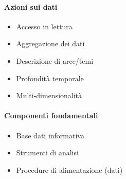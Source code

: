     \paragraph{Azioni sui dati}
        \begin{itemize}
            \item Accesso in lettura
            \item Aggregazione dei dati
            \item Descrizione di aree/temi
            \item Profondità temporale
            \item Multi-dimensionalità
        \end{itemize}
    \paragraph{Componenti fondamentali}
        \begin{itemize}
            \item Base dati informativa
            \item Strumenti di analisi
            \item Procedure di alimentazione (dati)
        \end{itemize}
